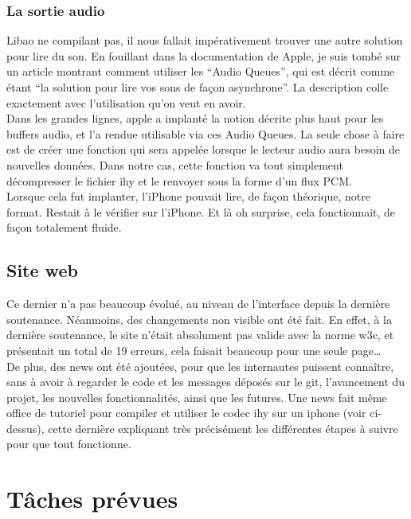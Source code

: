 \documentclass[a4paper,12pt]{article}
\begin{document}
		\subsubsection{La sortie audio}
Libao ne compilant pas, il nous fallait impérativement trouver une autre
solution pour lire du son. En fouillant dans la documentation de Apple, je suis
tombé sur un article montrant comment utiliser les ``Audio Queues'', qui est
décrit comme étant ``la solution pour lire vos sons de façon asynchrone''. La
description colle exactement avec l'utilisation qu'on veut en avoir.\\
Dans les grandes lignes, apple a implanté la notion décrite plus haut pour
les buffers audio, et l'a rendue utilisable via ces Audio Queues. La seule chose
à faire est de créer une fonction qui sera appelée lorsque le lecteur audio aura
besoin de nouvelles données. Dans notre cas, cette fonction va tout simplement
décompresser le fichier ihy et le renvoyer sous la forme d'un flux PCM.\\
Lorsque cela fut implanter, l'iPhone pouvait lire, de façon théorique, notre
format. Restait à le vérifier sur l'iPhone. Et là oh surprise, cela
fonctionnait, de façon totalement fluide. 
	\subsection{Site web}
Ce dernier n'a pas beaucoup évolué, au niveau de l'interface depuis la dernière
soutenance. Néanmoins, des changements non visible ont été fait. En effet, à la
dernière soutenance, le site n'était absolument pas valide avec la norme w3c, et
présentait un total de 19 erreurs, cela faisait beaucoup pour une seule
page\ldots\\
De plus, des news ont été ajoutées, pour que les internautes puissent connaître,
sans à avoir à regarder le code et les messages déposés sur le git, l'avancement
du projet, les nouvelles fonctionnalités, ainsi que les futures. Une news fait
même office de tutoriel pour compiler et utiliser le codec ihy sur un iphone
(voir ci-dessus), cette dernière expliquant très précisément les différentes
étapes à suivre pour que tout fonctionne.

\newpage

\section{Tâches prévues}
\end{document}
